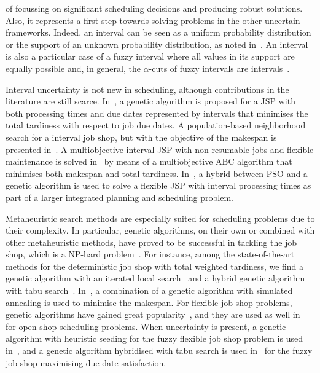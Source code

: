 \documentclass[12pt,halfline,a4paper]{ouparticle}
\begin{document}
of focussing on significant scheduling decisions and producing robust solutions. Also, it represents a first step towards solving problems in the other uncertain frameworks. Indeed, an interval can be seen as a uniform probability distribution or the support of an unknown probability distribution, as noted in~\cite{Allahverdi2014}. An interval is also a particular case of a fuzzy interval where all values in its support are equally possible and, in general, the $\alpha$-cuts of fuzzy intervals are intervals~\cite{Dubois2003}.


Interval uncertainty is not new in scheduling, although contributions in the literature are still scarce. In~\cite{Lei2012c}, a genetic algorithm is proposed for a JSP with both processing times and due dates represented by intervals that minimises the total tardiness with respect to job due dates. A population-based neighborhood search for a interval job shop, but with the objective of the makespan is presented in~\cite{Lei2011}. A multiobjective interval JSP with non-resumable jobs and flexible maintenance is solved in~\cite{Lei2013} by means of a multiobjective ABC algorithm that minimises both makespan and total tardiness. In~\cite{Li2019}, a hybrid between PSO and a genetic algorithm is used to solve a flexible JSP with interval processing times as part of a larger integrated planning and scheduling problem.

Metaheuristic search methods are especially suited for scheduling problems due to their complexity. In particular, genetic algorithms, on their own or combined with other metaheuristic methods, have proved to be successful in tackling the job shop, which is a NP-hard problem~\cite{Garey1976}. For instance, among the state-of-the-art methods for the deterministic job shop with total weighted tardiness,  we find a genetic algorithm with an iterated local search~\cite{Essafi2008} and a hybrid genetic algorithm with tabu search~\cite{Gonzalez2012}. In~\cite{Zhang2008}, a combination of a genetic algorithm with simulated annealing is used to minimise the makespan. For flexible job shop problems, genetic algorithms have gained great popularity~\cite{Amjad2018}, and they are used as well in~\cite{Hosseinabadi2019} for open shop scheduling problems. When uncertainty is present, a genetic algorithm with heuristic seeding for the fuzzy flexible job shop problem is used in~\cite{Palacios2015}, and a genetic algorithm hybridised with tabu search is used in~\cite{Vela2020} for the fuzzy job shop maximising due-date satisfaction.
\end{document}
